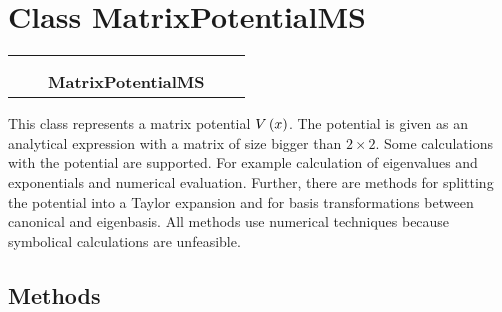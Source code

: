 
\section{Class MatrixPotentialMS}

    \label{MatrixPotentialMS:MatrixPotentialMS}
\begin{tabular}{cccccc}
\multicolumn{2}{r}{\settowidth{\BCL}{MatrixPotential}\multirow{2}{\BCL}{MatrixPotential}}
&&
  \\\cline{3-3}
  &&\multicolumn{1}{c|}{}
&&
  \\
&&\multicolumn{2}{l}{\textbf{MatrixPotentialMS}}
\end{tabular}

This class represents a matrix potential $V\left( x \right)$. The
potential is given as an analytical expression with a matrix of size bigger
than $2 \times 2$. Some calculations with the potential are supported.
For example calculation of eigenvalues and exponentials and numerical
evaluation. Further, there are methods for splitting the potential into a
Taylor expansion and for basis transformations between canonical and
eigenbasis. All methods use numerical techniques because symbolical
calculations are unfeasible.



  \subsection{Methods}

    \vspace{0.5ex}

